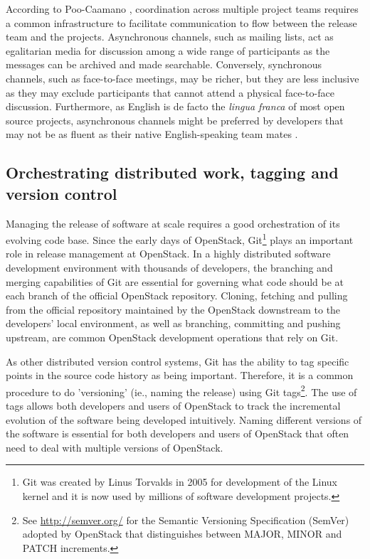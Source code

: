 \documentclass[dvipsnames]{bmcart}
\theoremstyle{definition}
\begin{document}
According to Poo-Caamano  \cite{Poo-Caamano2017}, coordination across multiple project teams requires a common infrastructure to facilitate communication to flow between the release team and the projects. Asynchronous channels, such as mailing lists, act as egalitarian media for discussion among a wide range of participants as the messages can be archived and made searchable. Conversely, synchronous channels, such as face-to-face meetings, may be richer, but they are less inclusive as they may exclude participants that cannot attend a physical face-to-face discussion. 
Furthermore, as English is de facto the \textit{lingua franca} of most open source projects, asynchronous channels might be preferred by developers that may not be as fluent as their native English-speaking team mates \cite{Poo-Caamano2017}. 


\subsection{Orchestrating distributed work, tagging and version control} 


Managing the release of software at scale requires a good orchestration of its evolving code base. Since the early days of OpenStack, Git\footnote{Git was created by Linus Torvalds in 2005 for development of the Linux kernel and it is now used by millions of software development projects.} plays an important role in release management at OpenStack. In a highly distributed software development environment with thousands of developers, the branching and merging capabilities of Git are essential for governing what code should be at each branch of the official OpenStack repository. Cloning, fetching and pulling from the official repository maintained by the OpenStack downstream to the developers' local environment, as well as branching, committing and pushing upstream, are common OpenStack development operations that rely on Git. 


As other distributed version control systems, Git has the ability to tag specific points in the source code history as being important. Therefore, it is a common procedure to do 'versioning' (ie., naming the release) using Git tags\footnote{See \url{http://semver.org/} for the Semantic Versioning Specification (SemVer) adopted by OpenStack that distinguishes between MAJOR, MINOR and PATCH increments.}. The use of tags allows both developers and users of OpenStack to track the incremental evolution of the software being developed intuitively. Naming different versions of the software is essential for both developers and users of OpenStack that often need to deal with multiple versions of OpenStack. 
\end{document}
